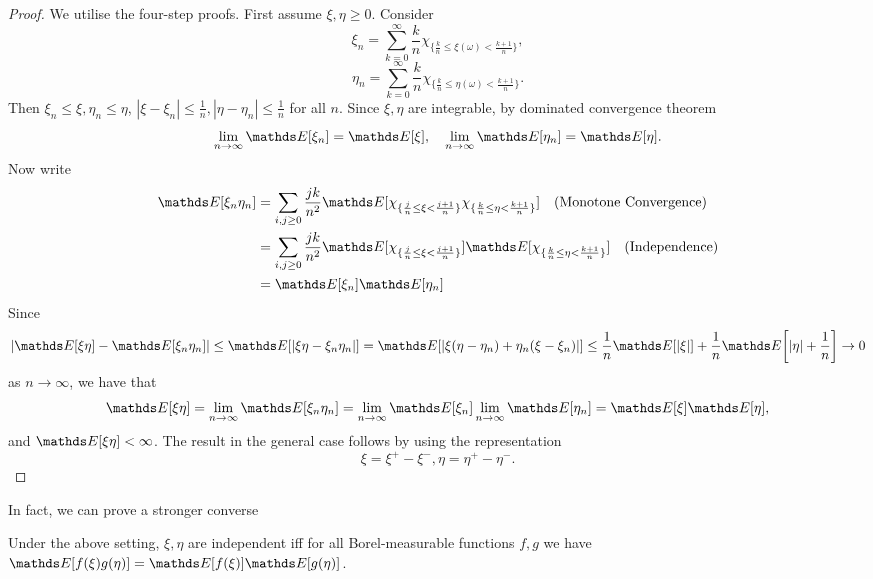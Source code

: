 \begin{proof}
We utilise the four-step proofs. First assume $\xi, \eta \ge 0$. Consider
\begin{equation*}
    \xi_n = \sum_{k=0}^\infty \frac{k}{n}\chi_{\{\frac{k}{n} \le \xi(\omega) < \frac{k+1}{n}\}},
\end{equation*}
\begin{equation*}
    \eta_n = \sum_{k=0}^\infty \frac{k}{n}\chi_{\{\frac{k}{n} \le \eta(\omega) < \frac{k+1}{n}\}}.
\end{equation*}
Then $\xi_n \le \xi, \eta_n \le \eta$, $|\xi - \xi_n|\le \frac{1}{n}, |\eta - \eta_n|\le \frac{1}{n}$ for all $n$. Since $\xi, \eta$ are integrable, by dominated convergence theorem
\begin{equation*}
    \lim_{n\rightarrow \infty} \E[\xi_n] = \E[\xi], \quad \lim_{n\rightarrow \infty} \E[\eta_n] = \E[\eta].
\end{equation*}
Now write
\begin{align*}
    \E[\xi_n \eta_n] &= \sum_{i,j \ge 0} \frac{jk}{n^2}\E[\chi_{\{ \frac{j}{n} \le \xi < \frac{j+1}{n}\}} \chi_{\{ \frac{k}{n} \le \eta < \frac{k+1}{n}\}}] \quad \text{(Monotone Convergence)}\\
    &= \sum_{i,j \ge 0} \frac{jk}{n^2} \E[\chi_{\{ \frac{j}{n} \le \xi < \frac{j+1}{n}\}}] \E[\chi_{\{ \frac{k}{n} \le \eta < \frac{k+1}{n}\}}]  \quad \text{(Independence)}\\
    &=\E[\xi_n]\E[\eta_n]
\end{align*}
Since 
\begin{equation*}
    |\E[\xi\eta]-\E[\xi_n \eta_n]| \le \E[|\xi \eta - \xi_n \eta_n|] = \E[|\xi(\eta - \eta_n)+ \eta_n(\xi - \xi_n)|] \le \frac{1}{n}\E[|\xi|]+\frac{1}{n}\E\bigg[|\eta|+\frac{1}{n}\bigg] \rightarrow 0
\end{equation*}
as $n \rightarrow \infty$, we have that
\begin{equation*}
    \E[\xi \eta] = \lim_{n \rightarrow \infty} \E[\xi_n \eta_n] = \lim_{n \rightarrow \infty} \E[\xi_n] \lim_{n \rightarrow \infty}\E[\eta_n] = \E[\xi] \E[\eta],
\end{equation*}
and $\E[\xi \eta] < \infty$. The result in the general case follows by using the representation $$\xi = \xi^+ - \xi^-, \eta = \eta^+ - \eta^-.$$
\end{proof}

In fact, we can prove a stronger converse
\begin{proposition}
Under the above setting, $\xi,\eta$ are independent iff for all Borel-measurable functions $f,g$ we have $\E[f(\xi) g(\eta)] = \E[f(\xi)] \E[g(\eta)]$.
\end{proposition}

